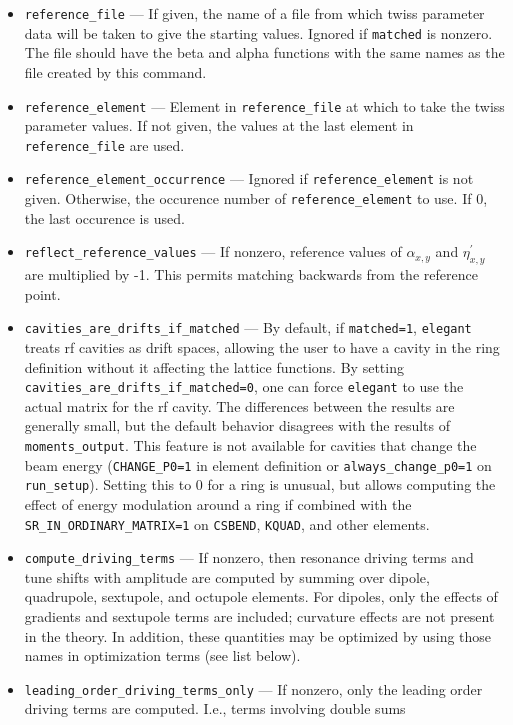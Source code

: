 \documentclass[11pt]{article}
\begin{document}
\begin{itemize}
\item \verb|reference_file| --- If given, the name of a file from which twiss parameter data will
        be taken to give the starting values.  Ignored if \verb|matched| is nonzero.  The file
        should have the beta and alpha functions with the same names as the file created by
        this command.
\item \verb|reference_element| --- Element in \verb|reference_file| at which to take the
        twiss parameter values.  If not given, the values at the last element in \verb|reference_file|
        are used.
\item \verb|reference_element_occurrence| --- Ignored if \verb|reference_element| is not given.
        Otherwise, the occurence number of \verb|reference_element| to use.  If 0, the last
        occurence is used.
\item \verb|reflect_reference_values| --- If nonzero, reference values of $\alpha_{x,y}$ and $\eta^\prime_{x,y}$ are
  multiplied by -1.  This permits matching backwards from the reference point.
\item \verb|cavities_are_drifts_if_matched| --- By default,  if \verb|matched=1|, {\tt elegant} treats rf cavities
  as drift spaces, allowing the user to have a cavity in the ring definition without it affecting the lattice functions.
  By setting \verb|cavities_are_drifts_if_matched=0|, one can force {\tt elegant} to use the actual matrix for the
  rf cavity.  The differences between the 
  results are generally small, but the default behavior disagrees with the results of \verb|moments_output|.
  This feature is not available for cavities that change the beam energy (\verb|CHANGE_P0=1| in element definition 
  or \verb|always_change_p0=1| on \verb|run_setup|).
  Setting this to 0 for a ring is unusual, but allows computing the effect of energy modulation around a ring if
  combined with the \verb|SR_IN_ORDINARY_MATRIX=1| on \verb|CSBEND|, \verb|KQUAD|, and other elements.
\item \verb|compute_driving_terms| --- If nonzero, then resonance driving terms \cite{Bengtsson, WangCXDrivingTerms, Bengtsson-SSC232} and
 tune shifts with amplitude are computed by summing over dipole, quadrupole, sextupole, and octupole elements.  For dipoles, only the effects of gradients and
 sextupole terms are included; curvature effects are not present in the theory.   In addition, these quantities may be optimized 
 by using those names in optimization terms (see list below).
\item \verb|leading_order_driving_terms_only| --- If nonzero, only the leading order driving terms are computed. I.e., terms involving double sums

\end{itemize}
\end{document}
